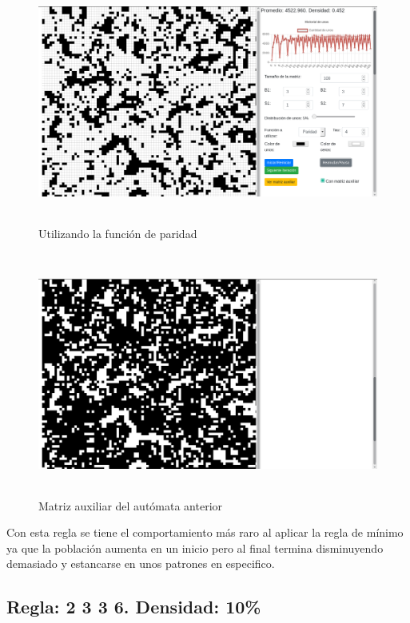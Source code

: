 \documentclass[12pt, titlepage]{article}
\begin{document}
\begin{figure}[H]
\begin{center}
 \includegraphics[width=15cm, height=8cm]{./img/3317-paridad.png}
 \caption{Utilizando la función de paridad}
 \label{fig:3317-paridad}
\end{center}
\end{figure}

\begin{figure}[H]
\begin{center}
 \includegraphics[width=15cm, height=8cm]{./img/3317-paridad-aux.png}
 \caption{Matriz auxiliar del autómata anterior}
 \label{fig:3317-paridad-aux}
\end{center}
\end{figure}
Con esta regla se tiene el comportamiento más raro al aplicar la regla de mínimo ya que la población aumenta en un inicio pero al final termina disminuyendo demasiado y estancarse en unos patrones en especifico.
\subsection{Regla: 2 3 3 6. Densidad: 10\%}
\end{document}
